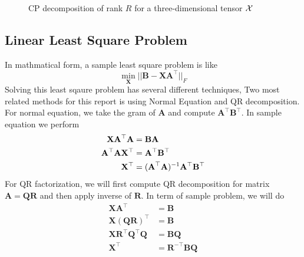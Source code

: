 \documentclass{article}
\newcommand{\mat}[1]{\mathbf{#1}}
\newcommand{\M}[2][]{\bm{#1{\mathbf{\MakeUppercase{#2}}}}} 		%
\newcommand{\V}[2][]{\bm{#1{\mathbf{\MakeLowercase{#2}}}}} 		%
\newcommand{\T}[2][]{#1{\mathbf{\cal{#2}}}} 						%
\begin{document}
\begin{figure}[ht!]
\caption{CP decomposition of rank $R$ for a three-dimensional tensor $\T{X}$ \label{fig:3d-cp-decomp}}
\end{figure}
\subsection*{Linear Least Square Problem}
In mathmatical form, a sample least square problem is like 
$$\min_{\mat{X}}||\mat{B} - \mat{X}\mat{A}^\top||_{F}$$
Solving this least sqaure problem has several different techniques, Two most related methods for this report
is using Normal Equation and QR decomposition.
For normal equation, we take the gram of $\mat{A}$ and compute $\mat{A}^\top\mat{B}^\top$. In sample equation we perform
\begin{align}
\mat{X}\mat{A}^\top\mat{A} &= \mat{B}\mat{A} \nonumber \\
\mat{A}^\top\mat{A}\mat{X}^\top &= \mat{A}^\top\mat{B}^\top \nonumber \\
\mat{X}^\top &= (\M{A}^\top\mat{A})^{-1}\mat{A}^\top\mat{B}^\top \nonumber
\end{align}
For QR factorization, we will first compute QR decomposition for matrix $\mat{A} = \mat{Q}\mat{R}$ and then apply inverse of $\mat{R}$. In term
of sample problem, we will do
\begin{align}
  \mat{X}\mat{A}^\top &= \mat{B} \nonumber \\
  \mat{X}(\mat{Q}\mat{R})^\top &= \mat{B} \nonumber \\
  \mat{X}\mat{R}^\top\mat{Q}^\top\mat{Q} &= \mat{B}\mat{Q} \nonumber \\
  \mat{X}^\top &= \mat{R}^{-\top}\mat{B}\mat{Q} \nonumber
\end{align} 
\end{document}
